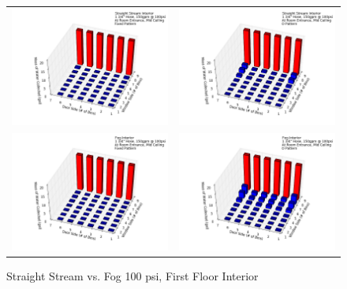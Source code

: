 \documentclass{article}
\begin{document}
\begin{appendices}
\clearpage

\begin{figure}[ht]
\begin{tabular*}{\textwidth}{lr}
\includegraphics[width=3.2in]{../ADD_Analysis/Figures/15-12-09_112850_Datafile_Straight_Stream_Interior.png} &
\includegraphics[width=3.2in]{../ADD_Analysis/Figures/15-12-09_113335_Datafile_Straight_Stream_Interior.png} \\
\includegraphics[width=3.2in]{../ADD_Analysis/Figures/15-12-09_113802_Datafile_Fog_Interior.png} &
\includegraphics[width=3.2in]{../ADD_Analysis/Figures/15-12-09_114240_Datafile_Fog_Interior.png} \\
\end{tabular*}
\caption{Straight Stream vs. Fog 100 psi, First Floor Interior}
\label{fig:Straight Stream vs. Fog 100 psi, First Floor Interior}
\end{figure}


\end{appendices}
\end{document}
